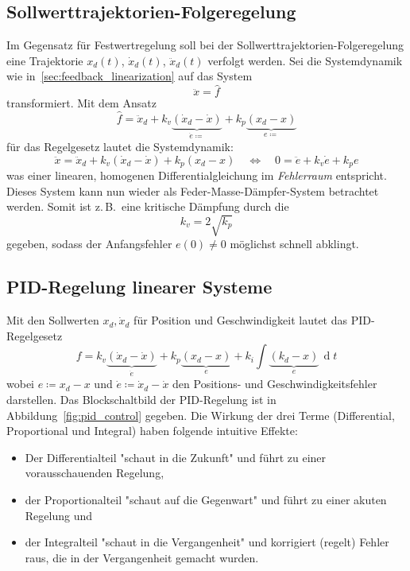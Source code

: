 \documentclass[a4paper, 11pt, accentcolor = tud3b]{tudreport}
\DeclareMathOperator{\total}{d}
\newcommand{\dif}[1]{\,\total#1}
\newcommand{\zB}{z.\,B.~}
\begin{document}
			\subsection{Sollwerttrajektorien-Folgeregelung}
				Im Gegensatz für Festwertregelung soll bei der Sollwerttrajektorien-Folgeregelung eine Trajektorie \( x_d(t) \), \( \dot{x}_d(t) \), \( \ddot{x}_d(t) \) verfolgt werden. Sei die Systemdynamik wie in~\ref{sec:feedback_linearization} auf das System
				\begin{equation*}
					\ddot{x} = \hat{f}
				\end{equation*}
				transformiert. Mit dem Ansatz
				\begin{equation*}
					\hat{f} = \ddot{x}_d + k_v \underbrace{(\dot{x}_d - \dot{x})}_{\dot{e} \coloneqq} + k_p \underbrace{(x_d - x)}_{e \coloneqq}
				\end{equation*}
				für das Regelgesetz lautet die Systemdynamik:
				\begin{equation*}
					\ddot{x} = \ddot{x}_d + k_v (\dot{x}_d - \dot{x}) + k_p (x_d - x) \quad\iff\quad 0 = \ddot{e} + k_v \dot{e} + k_p e
				\end{equation*}
				was einer linearen, homogenen Differentialgleichung im \emph{Fehlerraum} entspricht. Dieses System kann nun wieder als Feder-Masse-Dämpfer-System betrachtet werden. Somit ist \zB eine kritische Dämpfung durch die
				\begin{equation*}
					k_v = 2 \sqrt{k_p}
				\end{equation*}
				gegeben, sodass der Anfangsfehler \( e(0) \neq 0 \) möglichst schnell abklingt.

			\subsection{PID-Regelung linearer Systeme}  %
				Mit den Sollwerten \( x_d, \dot{x}_d \) für Position und Geschwindigkeit lautet das PID-Regelgesetz
				\begin{equation*}
					f = k_v \underbrace{(\dot{x}_d - \dot{x})}_{\dot{e}} + k_p \underbrace{(x_d - x)}_{e} + k_i \int \! \underbrace{(k_d - x)}_{e} \dif{t}
				\end{equation*}
				wobei \( e \coloneqq x_d - x \) und \( \dot{e} \coloneqq \dot{x}_d - \dot{x} \) den Positions- und Geschwindigkeitsfehler darstellen. Das Blockschaltbild der PID-Regelung ist in Abbildung~\ref{fig:pid_control} gegeben. Die Wirkung der drei Terme (Differential, Proportional und Integral) haben folgende intuitive Effekte:
				\begin{itemize}
					\item Der Differentialteil "schaut in die Zukunft" und führt zu einer vorausschauenden Regelung,
					\item der Proportionalteil "schaut auf die Gegenwart" und führt zu einer akuten Regelung und
					\item der Integralteil "schaut in die Vergangenheit" und korrigiert (regelt) Fehler raus, die in der Vergangenheit gemacht wurden.
				\end{itemize}
			
\end{document}
